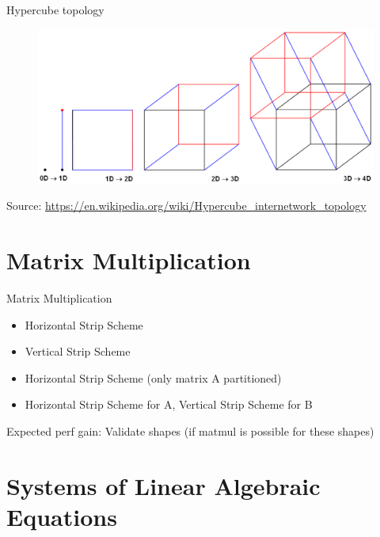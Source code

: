 \documentclass{beamer}
\begin{document}
\begin{frame}{Hypercube topology}
  \begin{figure}[h]
    \includegraphics[width=1\textwidth]{images/hypercube-topology.png}
  \end{figure}
  Source: \href{https://en.wikipedia.org/wiki/Hypercube_internetwork_topology}{https://en.wikipedia.org/wiki/Hypercube\_internetwork\_topology}
\end{frame}

\section{Matrix Multiplication}

\begin{frame}{Matrix Multiplication}
  \begin{itemize}
    \item Horizontal Strip Scheme
    \item Vertical Strip Scheme
    \item Horizontal Strip Scheme (only matrix A partitioned)
    \item Horizontal Strip Scheme for A, Vertical Strip Scheme for B
  \end{itemize}
  Expected perf gain:
  Validate shapes (if matmul is possible for these shapes)
\end{frame}

\section{Systems of Linear Algebraic Equations}
\end{document}

